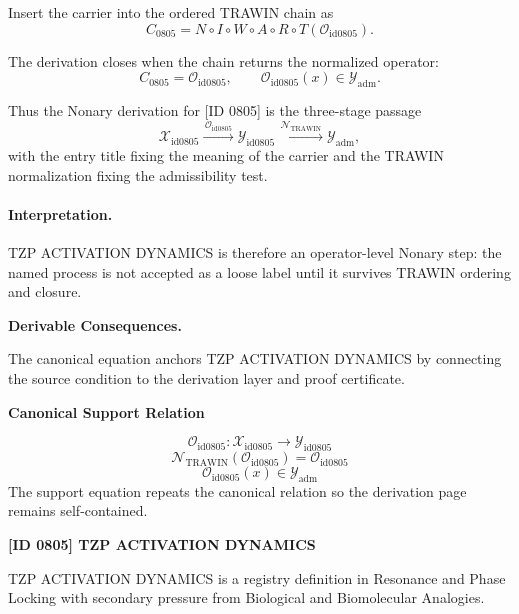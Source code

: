 Insert the carrier into the ordered TRAWIN chain as\[
C_{0805}=N\circ I\circ W\circ A\circ R\circ T(\mathcal{O}_{\mathrm{id0805}}).
\]

The derivation closes when the chain returns the normalized operator:\[
C_{0805}=\mathcal{O}_{\mathrm{id0805}},\qquad \mathcal{O}_{\mathrm{id0805}}(x)\in\mathcal{Y}_{\mathrm{adm}}.
\]

Thus the Nonary derivation for [ID 0805] is the three-stage passage
\[
\mathcal{X}_{\mathrm{id0805}}\xrightarrow{\,\mathcal{O}_{\mathrm{id0805}}\,} \mathcal{Y}_{\mathrm{id0805}}\xrightarrow{\,\mathcal{N}_{\mathrm{TRAWIN}}\,} \mathcal{Y}_{\mathrm{adm}},
\]
with the entry title fixing the meaning of the carrier and the TRAWIN normalization fixing the admissibility test.

\paragraph{Interpretation.} TZP ACTIVATION DYNAMICS is therefore an operator-level Nonary step: the named process is not accepted as a loose label until it survives TRAWIN ordering and closure.

\par\vspace{0.35em}
\noindent\textbf{Derivable Consequences.}\quad
\begingroup
\footnotesize
\raggedright
The canonical equation anchors TZP ACTIVATION DYNAMICS by connecting the source condition to the derivation layer and proof certificate.
\par\endgroup

\noindent\textbf{Canonical Support Relation}\par
\[
\mathcal{O}_{\mathrm{id0805}}:\mathcal{X}_{\mathrm{id0805}}\longrightarrow\mathcal{Y}_{\mathrm{id0805}}
\]
\[
\mathcal{N}_{\mathrm{TRAWIN}}(\mathcal{O}_{\mathrm{id0805}})=\mathcal{O}_{\mathrm{id0805}}
\]
\[
\mathcal{O}_{\mathrm{id0805}}(x)\in\mathcal{Y}_{\mathrm{adm}}
\]
\noindent The support equation repeats the canonical relation so the derivation page remains self-contained.\par

\clearpage
\noindent\textbf{[ID 0805] TZP ACTIVATION DYNAMICS}\par
\vspace{0.35em}
\begingroup\small
{}
TZP ACTIVATION DYNAMICS is a registry definition in Resonance and Phase Locking with secondary pressure from Biological and Biomolecular Analogies.

